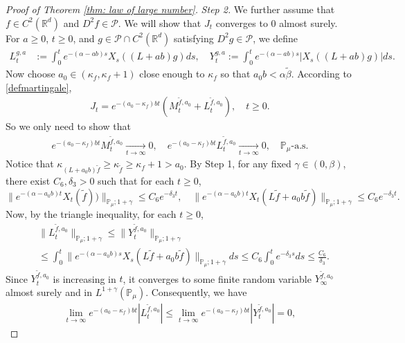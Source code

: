 \documentclass[EJP]{ejpecp} %
\begin{document}
\begin{proof}[Proof of Theorem \ref{thm: law of large number}]
  \emph{Step 2.}
  We further assume that $f\in C^2(\mathbb R^d)$ and $D^2f \in \mathcal{P}$.
  We will show that $J_t$ converges to $0$ almost surely.
  For $a \geq 0$, $ t\geq 0$, and $g\in \mathcal{P}\cap C^2(\mathbb{R}^d)$ satisfying $D^2g\in \mathcal{P}$, we define
  \begin{align}
    L_t^{g,a}
    & :=\int_0^t e^{-(\alpha-ab)s}X_s((L+ab)g) ds,
    \quad
    Y_t^{g,a}
    :=\int_0^t e^{-(\alpha-ab)s}|X_s((L+ab)g)|ds.
  \end{align}
  Now choose $a_0 \in (\kappa_{f}, \kappa_f + 1)$ close enough to $\kappa_f$ so that $a_0 b < \alpha \tilde \beta$.
  According to \eqref{defmartingale},
  \begin{align}
    J_t
    = e^{-(a_0-\kappa_f)bt} (M_t^{\widetilde{f}, a_0}+L_t^{\widetilde{f}, a_0}),
    \quad t\geq 0.
  \end{align}
  So we only need to show that
  \begin{align}
    e^{-(a_0-\kappa_f)b t}M_t^{\widetilde{f},a_0}
    \xrightarrow[t\to \infty]{} 0,
    \quad e^{-(a_0-\kappa_f)b t}L_t^{\widetilde{f},a_0}
    \xrightarrow[t\to \infty]{} 0,
    \quad \mathbb{P}_{\mu}\text{-a.s.}
  \end{align}
  Notice that $\kappa_{(L+a_0 b)\widetilde{f}}\geq \kappa_{\widetilde{f}}\geq \kappa_f+1 > a_0$.
  By Step 1, for any fixed $\gamma\in (0,\beta)$, there exist $C_6, \delta_3>0$ such that for each $t\geq 0$,
  \[
    \| e^{-(\alpha-a_0 b)t}X_t(\widetilde{f}))\|_{\mathbb{P}_{\mu};1+\gamma}
    \leq C_6 e^{-\delta_3 t},
    \quad \|e^{-(\alpha-a_0 b)t}X_t(L\widetilde{f}+a_0 b\widetilde{f})\|_{\mathbb{P}_{\mu};1+\gamma}
    \leq C_6 e^{-\delta_3 t}.
  \]
  Now, by the triangle inequality, for each $t\geq 0$,
  \begin{align}
    & \|L_t^{\widetilde{f},a_0}\|_{\mathbb{P}_{\mu};1+\gamma}
      \leq\|Y_t^{\widetilde{f},a_0}\|_{\mathbb{P}_{\mu};1+\gamma} \\
    & \leq \int_0^t \|e^{-(\alpha-a_0 b)s}X_s( L\widetilde{f}+a_0 b\widetilde{f})\|_{\mathbb{P}_{\mu};1+\gamma}ds\leq C_6 \int_0^t e^{-\delta_3 s}ds\leq\frac{C_6}{\delta_3}.
  \end{align}
  Since $Y_t^{\widetilde{f},a_0}$ is increasing in $t$, it converges to some finite random variable $Y_{\infty}^{\widetilde{f},a_0}$ almost surely and in $L^{1+\gamma}(\mathbb{P}_{\mu})$.
  Consequently,  we have
  \begin{align}
    \lim_{t\rightarrow \infty}e^{-(a_0 - \kappa_f)bt}|L_t^{\widetilde{f},a_0}|
    \leq  \lim_{t\rightarrow \infty}e^{-(a_0 - \kappa_f)bt}|Y_t^{\widetilde{f},a_0}|=0,

\end{align}
\end{proof}
\end{document}

